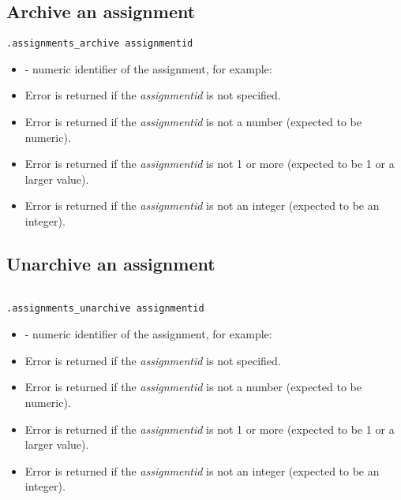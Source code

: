 \subsection{Archive an assignment}

\begin{lstlisting}[style=CommandLineStyle]
.assignments_archive assignmentid
\end{lstlisting}

\paramsheader
\begin{itemize}

    \item {} - numeric identifier of the assignment, for
    example:

\end{itemize}

\errheader
\begin{itemize}
    \item Error  is returned if the \textit{assignmentid} is not specified.
    \item Error  is returned if the \textit{assignmentid} is not a number (expected to be numeric).
    \item Error  is returned if the \textit{assignmentid} is not 1 or more (expected to be 1 or a larger value).
    \item Error  is returned if the \textit{assignmentid} is not an integer (expected to be an integer).
\end{itemize}



\subsection{Unarchive an assignment}

\begin{lstlisting}[style=CommandLineStyle, showlines=true]

.assignments_unarchive assignmentid

\end{lstlisting}

\paramsheader
\begin{itemize}

    \item {} - numeric identifier of the assignment, for example:

\end{itemize}

\errheader
\begin{itemize}
    \item Error  is returned if the \textit{assignmentid} is not specified.
    \item Error  is returned if the \textit{assignmentid} is not a number (expected to be numeric).
    \item Error  is returned if the \textit{assignmentid} is not 1 or more (expected to be 1 or a larger value).
    \item Error  is returned if the \textit{assignmentid} is not an integer (expected to be an integer).
\end{itemize}


